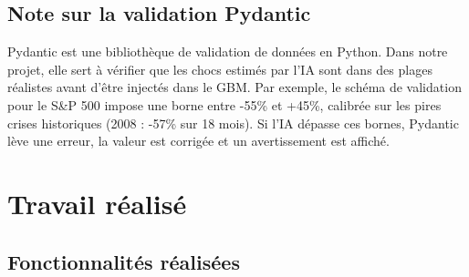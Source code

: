 \documentclass[a4paper, 12pt, twoside]{article}
\begin{document}
\subsection{Note sur la validation Pydantic}

Pydantic est une bibliothèque de validation de données en Python. Dans notre projet,
elle sert à vérifier que les chocs estimés par l'IA sont dans des plages réalistes
avant d'être injectés dans le GBM. Par exemple, le schéma de validation pour le
S\&P 500 impose une borne entre -55\% et +45\%, calibrée sur les pires crises
historiques (2008 : -57\% sur 18 mois). Si l'IA dépasse ces bornes, Pydantic lève
une erreur, la valeur est corrigée et un avertissement est affiché.

\newpage

\section{Travail réalisé}

\subsection{Fonctionnalités réalisées}
\end{document}
